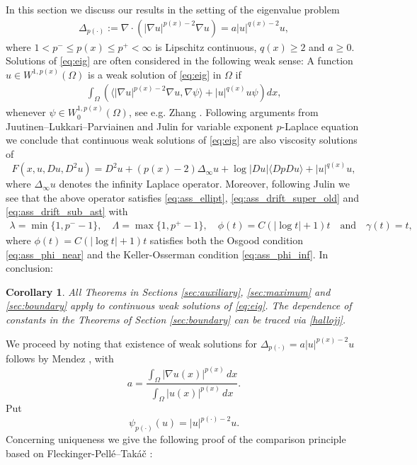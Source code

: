 \documentclass[12pt]{article}
\newtheorem{corollary}[theorem]{Corollary}
\numberwithin{komcounter}{section}
\begin{document}
In this section we discuss our results in the setting of the eigenvalue problem
%
\begin{align}\label{eq:eig}
\Delta_{p(\cdot)} := \nabla \cdot \left( |\nabla u|^{p(x)-2} \nabla u\right) = a|u|^{q(x)-2} u,
\end{align}
%
where $1 < p^- \leq p(x) \leq p^+< \infty$ is Lipschitz continuous, $q(x) \geq 2$ and $a \geq 0$.
Solutions of \eqref{eq:eig} are often considered in the following weak sense:
A function $u \in W^{1, p(x)}(\Omega)$ is a weak solution of \eqref{eq:eig} in $\Omega$ if
%
\begin{align*}%
\int_{\Omega} \left( \langle |\nabla u|^{p(x)-2} \nabla u, \nabla \psi \rangle + |u|^{q(x)} u \psi \right) dx,
\end{align*}
%
whenever $\psi \in W_0^{1, p(x)}(\Omega)$, see e.g. Zhang \cite{Z05}.
Following arguments from Juutinen--Lukkari--Parviainen \cite{JLP10} and Julin \cite{J13} for variable exponent $p$-Laplace equation we conclude that continuous weak solutions of \eqref{eq:eig} are also viscosity solutions of
%
$$
F(x, u, Du, D^2u) = D^2 u + (p(x) - 2)\Delta_\infty u + \log |Du| \langle Dp Du\rangle + |u|^{q(x)} u,
$$
%
where $\Delta_\infty u$ denotes the infinity Laplace operator.
Moreover, following  Julin \cite{J13} we see that the above operator satisfies \eqref{eq:ass_ellipt}, \eqref{eq:ass_drift_super_old} and \eqref{eq:ass_drift_sub_ast} with
%
\begin{align}\label{hallojj}
\lambda = \min\{ 1, p^{-} - 1\}, \quad \Lambda = \max\{ 1, p^{+} - 1\}, \quad \phi(t) = C\left( |\log t| + 1\right) t  \quad \textrm{and} \quad
\gamma(t) = t,
\end{align}
%
where $\phi(t) = C\left( |\log t| + 1\right) t$ satisfies both the Osgood condition \eqref{eq:ass_phi_near} and the Keller-Osserman condition \eqref{eq:ass_phi_inf}. In conclusion:

\begin{corollary}
All Theorems in Sections \ref{sec:auxiliary}, \ref{sec:maximum} and \ref{sec:boundary} apply to continuous weak solutions of \eqref{eq:eig}.
The dependence of constants in the Theorems of Section \ref{sec:boundary} can be traced via \eqref{hallojj}.
\end{corollary}

We proceed by noting that existence of weak solutions for $\Delta_{p(\cdot)} = a|u|^{p(x)-2}u$ follows by Mendez \cite{Mendez}, with
%
\[
a = \frac{\int_\Omega |\nabla u(x)|^{p(x)}\,dx}{\int_\Omega |u(x)|^{p(x)}\,dx}.
\]
%
Put
\newcommand{\psip}{\psi_{p(\cdot)}}
\[
\psip(u) = |u|^{p(\cdot)-2}u.
\]
Concerning uniqueness we give the following proof of the comparison principle
based on Fleckinger-Pell\'e--Tak\'a\v{c} \cite[Proposition 4.1]{FPT}:
\end{document}
